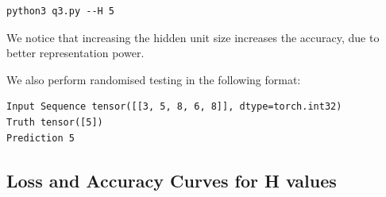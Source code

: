 \begin{lstlisting}
python3 q3.py --H 5
\end{lstlisting} 

We notice that increasing the hidden unit size increases the accuracy, due to better representation power.

We also perform randomised testing in the following format:\\
\begin{lstlisting}
Input Sequence tensor([[3, 5, 8, 6, 8]], dtype=torch.int32)
Truth tensor([5])
Prediction 5
\end{lstlisting}

\subsection{Loss and Accuracy Curves for H values}

